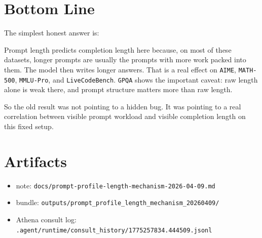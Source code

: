 \documentclass[11pt]{article}
\begin{document}
\section*{Bottom Line}
The simplest honest answer is:

Prompt length predicts completion length here because, on most of these datasets, longer prompts are usually the prompts with more work packed into them. The model then writes longer answers. That is a real effect on \texttt{AIME}, \texttt{MATH-500}, \texttt{MMLU-Pro}, and \texttt{LiveCodeBench}. \texttt{GPQA} shows the important caveat: raw length alone is weak there, and prompt structure matters more than raw length.

So the old result was not pointing to a hidden bug. It was pointing to a real correlation between visible prompt workload and visible completion length on this fixed setup.

\section*{Artifacts}
\begin{itemize}[leftmargin=1.5em]
\item note: \texttt{docs/prompt-profile-length-mechanism-2026-04-09.md}
\item bundle: \texttt{outputs/prompt\_profile\_length\_mechanism\_20260409/}
\item Athena consult log: \texttt{.agent/runtime/consult\_history/1775257834.444509.jsonl}
\end{itemize}
\end{document}

